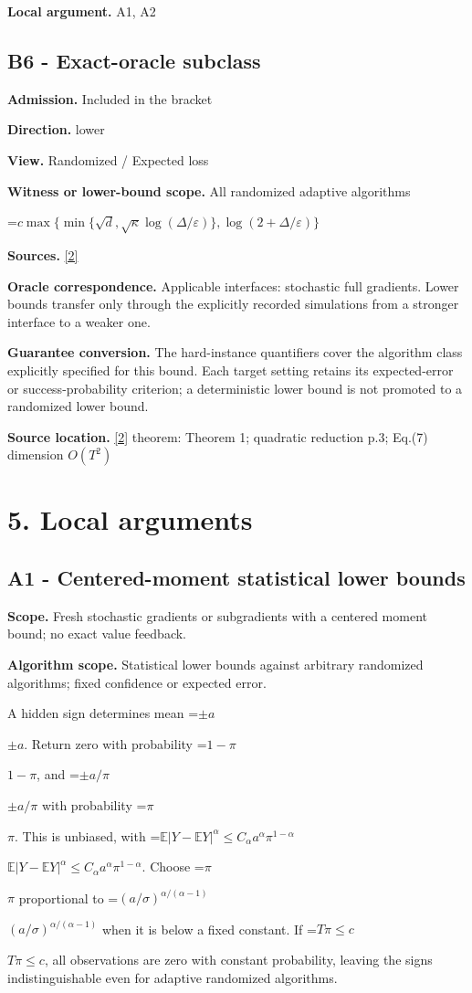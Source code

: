 \documentclass[10pt,a4paper]{article}
\newcommand{\AtlasMath}[1]{\par\begingroup\centering\setbox0=\hbox{$\displaystyle #1$}\ifdim\wd0>1.4\linewidth\typeout{ATLAS WIDE FORMULA: \the\wd0}\fi\ifdim\wd0>\linewidth\resizebox{\linewidth}{!}{\box0}\else\box0\fi\par\endgroup}
\newcommand{\AtlasInlineMath}[1]{\begingroup\setbox0=\hbox{$#1$}\ifdim\wd0>.4\linewidth\endgroup\AtlasMath{#1}\else\endgroup$#1$\fi}
\begin{document}
\textbf{Local argument.} A1, A2

\subsection{B6 - Exact-oracle subclass}
\textbf{Admission.} Included in the bracket

\textbf{Direction.} lower

\textbf{View.} Randomized / Expected loss

\textbf{Witness or lower-bound scope.} All randomized adaptive algorithms

\AtlasMath{c\max\{\min\{\sqrt d,\sqrt\kappa\log(\Delta/\varepsilon)\},\log(2+\Delta/\varepsilon)\}}
\textbf{Sources.} \href{https://arxiv.org/pdf/2609.10874}{[2]}

\textbf{Oracle correspondence.} Applicable interfaces: stochastic full gradients. Lower bounds transfer only through the explicitly recorded simulations from a stronger interface to a weaker one.

\textbf{Guarantee conversion.} The hard-instance quantifiers cover the algorithm class explicitly specified for this bound. Each target setting retains its expected-error or success-probability criterion; a deterministic lower bound is not promoted to a randomized lower bound.

\textbf{Source location.} \href{https://arxiv.org/pdf/2609.10874}{[2]} theorem: Theorem 1; quadratic reduction p.3; Eq.(7) dimension $O(T^2)$

\section{5. Local arguments}
\subsection{A1 - Centered-moment statistical lower bounds}
\textbf{Scope.} Fresh stochastic gradients or subgradients with a centered moment bound; no exact value feedback.

\textbf{Algorithm scope.} Statistical lower bounds against arbitrary randomized algorithms; fixed confidence or expected error.

A hidden sign determines mean \AtlasInlineMath{\pm a}. Return zero with probability \AtlasInlineMath{1-\pi}, and \AtlasInlineMath{\pm a/\pi} with probability \AtlasInlineMath{\pi}. This is unbiased, with
\AtlasInlineMath{\mathbb E|Y-\mathbb EY|^\alpha\le C_\alpha a^\alpha\pi^{1-\alpha}}.
Choose \AtlasInlineMath{\pi} proportional to \AtlasInlineMath{(a/\sigma)^{\alpha/(\alpha-1)}} when it is below a fixed constant. If \AtlasInlineMath{T\pi\le c}, all observations are zero with constant probability, leaving the signs indistinguishable even for adaptive randomized algorithms.
\end{document}
